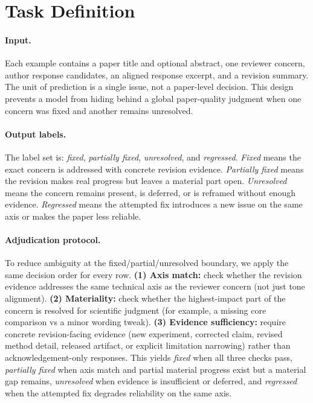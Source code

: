 \section{Task Definition}

\paragraph{Input.}
Each example contains a paper title and optional abstract, one reviewer concern, author response candidates, an aligned response excerpt, and a revision summary.
The unit of prediction is a single issue, not a paper-level decision.
This design prevents a model from hiding behind a global paper-quality judgment when one concern was fixed and another remains unresolved.

\paragraph{Output labels.}
The label set is:
\textit{fixed}, \textit{partially fixed}, \textit{unresolved}, and \textit{regressed}.
\textit{Fixed} means the exact concern is addressed with concrete revision evidence.
\textit{Partially fixed} means the revision makes real progress but leaves a material part open.
\textit{Unresolved} means the concern remains present, is deferred, or is reframed without enough evidence.
\textit{Regressed} means the attempted fix introduces a new issue on the same axis or makes the paper less reliable.

\paragraph{Adjudication protocol.}
To reduce ambiguity at the fixed/partial/unresolved boundary, we apply the same decision order for every row.
\textbf{(1) Axis match:} check whether the revision evidence addresses the same technical axis as the reviewer concern (not just tone alignment).
\textbf{(2) Materiality:} check whether the highest-impact part of the concern is resolved for scientific judgment (for example, a missing core comparison vs a minor wording tweak).
\textbf{(3) Evidence sufficiency:} require concrete revision-facing evidence (new experiment, corrected claim, revised method detail, released artifact, or explicit limitation narrowing) rather than acknowledgement-only responses.
This yields \textit{fixed} when all three checks pass, \textit{partially fixed} when axis match and partial material progress exist but a material gap remains, \textit{unresolved} when evidence is insufficient or deferred, and \textit{regressed} when the attempted fix degrades reliability on the same axis.

